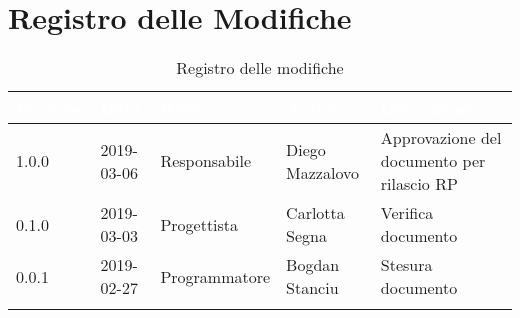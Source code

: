 \newpage

\section*{Registro delle Modifiche}

\begin{center}
\begin{longtable}[c]{|m{}|m{}|m{}|m{}|p{}|}
\hline
\rowcolor{bluelogo}\textbf{\textcolor{white}{Versione}} & \textbf{\textcolor{white}{Data}} & \textbf{\textcolor{white}{Ruolo}} & \textbf{\textcolor{white}{Autore}} & \textbf{\textcolor{white}{Descrizione}}\\
\hline \hline
\endfirsthead
\hline
1.0.0 & 2019-03-06 & Responsabile & Diego Mazzalovo & Approvazione del documento per rilascio RP\\
\rowcolor{grigio} 0.1.0 & 2019-03-03 & Progettista & Carlotta Segna & Verifica documento \\
0.0.1 & 2019-02-27 & Programmatore & Bogdan Stanciu & Stesura documento \\
\hline
\caption{Registro delle modifiche}
\end{longtable}
\end{center}
